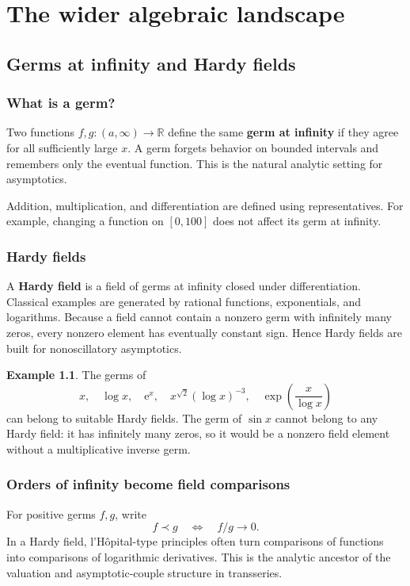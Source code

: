 \documentclass[11pt,openany]{book}
\theoremstyle{plain}
\theoremstyle{definition}
\newtheorem{example}[theorem]{Example}
\theoremstyle{remark}
\newcommand{\R}{\mathbb{R}}
\newcommand{\e}{\mathrm{e}}
\newcommand{\defterm}[1]{\textbf{#1}}
\begin{document}
\part{The wider algebraic landscape}

\chapter{Germs at infinity and Hardy fields}
\label{chap:hardy}

\section{What is a germ?}
Two functions $f,g:(a,\infty)\to\R$ define the same \defterm{germ at infinity} if they agree for all sufficiently large $x$. A germ forgets behavior on bounded intervals and remembers only the eventual function. This is the natural analytic setting for asymptotics.

Addition, multiplication, and differentiation are defined using representatives. For example, changing a function on $[0,100]$ does not affect its germ at infinity.

\section{Hardy fields}
A \defterm{Hardy field} is a field of germs at infinity closed under differentiation. Classical examples are generated by rational functions, exponentials, and logarithms. Because a field cannot contain a nonzero germ with infinitely many zeros, every nonzero element has eventually constant sign. Hence Hardy fields are built for nonoscillatory asymptotics.

\begin{example}
The germs of
\[
  x,\quad \log x,\quad \e^x,
  \quad x^{\sqrt2}(\log x)^{-3},
  \quad \exp\left(\frac{x}{\log x}\right)
\]
can belong to suitable Hardy fields. The germ of $\sin x$ cannot belong to any Hardy field: it has infinitely many zeros, so it would be a nonzero field element without a multiplicative inverse germ.
\end{example}

\section{Orders of infinity become field comparisons}
For positive germs $f,g$, write
\[
  f\prec g\quad\Longleftrightarrow\quad f/g\to0.
\]
In a Hardy field, l'H\^opital-type principles often turn comparisons of functions into comparisons of logarithmic derivatives. This is the analytic ancestor of the valuation and asymptotic-couple structure in transseries.
\end{document}

